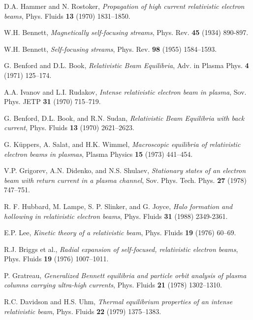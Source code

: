 \documentclass [12pt,a4paper,     ]{report} %
\begin{document}
\begin{enumerate}
 D.A. Hammer and N. Rostoker, \emph{Propagation of high current relativistic electron beams}, Phys. Fluids {\bf 13} (1970) 1831--1850.


 W.H. Bennett, \emph{Magnetically self-focusing streams}, Phys. Rev. {\bf 45} (1934) 890-897.

 W.H. Bennett, \emph{Self-focusing streams}, Phys. Rev. {\bf 98} (1955) 1584--1593.

 G. Benford and D.L. Book, \emph{Relativistic Beam Equilibria}, Adv. in Plasma Phys. {\bf 4} (1971) 125--174.

 A.A. Ivanov and L.I. Rudakov, \emph{Intense relativistic electron beam in plasma}, Sov. Phys. JETP {\bf 31} (1970) 715--719.

 G. Benford, D.L. Book, and R.N. Sudan, \emph{Relativistic Beam Equilibria with back current}, Phys. Fluids {\bf 13} (1970) 2621--2623.

 G. K\"uppers, A. Salat, and H.K. Wimmel, \emph{Macroscopic equilibria of relativistic electron beams in plasmas}, Plasma Physics {\bf 15} (1973) 441--454.

 V.P. Grigorev, A.N. Didenko, and N.S. Shulaev, \emph{Stationary states of an electron beam with return current in a plasma channel}, Sov. Phys. Tech. Phys. {\bf 27} (1978) 747--751.

   R. F. Hubbard, M. Lampe, S. P. Slinker, and G. Joyce, \emph{Halo formation and hollowing in relativistic electron beams}, Phys. Fluids {\bf 31} (1988) 2349-2361.

 E.P. Lee, \emph{Kinetic theory of a relativistic beam}, Phys. Fluids {\bf 19} (1976) 60--69. %

 R.J. Briggs et al., \emph{Radial expansion of self-focused, relativistic electron beams}, Phys. Fluids {\bf 19} (1976) 1007--1011.

 P. Gratreau, \emph{Generalized Bennett equilibria and particle orbit analysis of plasma columns carrying ultra-high currents}, Phys. Fluids {\bf 21} (1978) 1302--1310.

 R.C. Davidson and H.S. Uhm, \emph{Thermal equilibrium properties of an intense relativistic beam}, Phys. Fluids {\bf 22} (1979) 1375--1383.


\end{enumerate}
\end{document}
